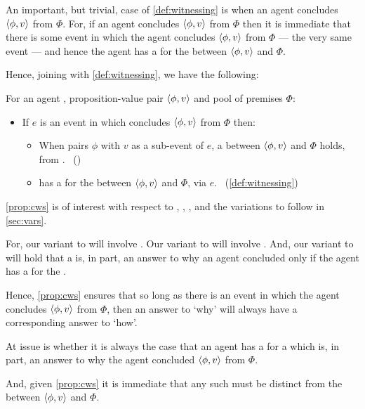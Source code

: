 \begin{note}
  An important, but trivial, case of \autoref{def:witnessing} is when an agent concludes \(\langle \phi, v \rangle\) from \(\Phi\).
  For, if an agent concludes \(\langle \phi, v \rangle\) from \(\Phi\) then it is immediate that there is some event in which the agent concludes \(\langle \phi, v \rangle\) from \(\Phi\) --- the very same event --- and hence the agent has a \wit{} for the \ros{} between \(\langle \phi, v \rangle\) and \(\Phi\).

  Hence, joining \supportI{} with \autoref{def:witnessing}, we have the following:

  \begin{proposition}
    \label{prop:cws}
    For an agent \vAgent{}, proposition-value pair \(\langle \phi, v \rangle\) and pool of premises \(\Phi\):
    \begin{itemize}
    \item
      If \(e\) is an event in which \vAgent{} concludes \(\langle \phi, v \rangle\) from \(\Phi\) then:
      \begin{itemize}
      \item
        When \vAgent{} pairs \(\phi\) with \(v\) as a sub-event of \(e\), a \ros{} between \(\langle \phi, v \rangle\) and \(\Phi\) holds, from .%
        \mbox{ }\hfill(\supportI{})
      \item
        \vAgent{} has a \wit{} for the \ros{} between \(\langle \phi, v \rangle\) and \(\Phi\), via \(e\).%
        \mbox{ }\hfill(\autoref{def:witnessing})
      \end{itemize}
    \end{itemize}
    \vspace{-\baselineskip}
  \end{proposition}

  \autoref{prop:cws} is of interest with respect to \qWhy{}, \qHow{}, \issueInclusion{}, and the variations to follow in \autoref{sec:vars}.

  For, our variant to \qWhy{} will involve .
  Our variant to \qHow{} will involve .
  And, our variant to \issueInclusion{} will hold that a \ros{} is, in part, an answer to why an agent concluded only if the agent has a \wit{} for the \ros{}.

  Hence, \autoref{prop:cws} ensures that so long as there is an event in which the agent concludes \(\langle \phi, v \rangle\) from \(\Phi\), then an answer to `why' will always have a corresponding answer to `how'.

  At issue is whether it is always the case that an agent has a \wit{} for a \ros{} which is, in part, an answer to why the agent concluded \(\langle \phi, v \rangle\) from \(\Phi\).

  And, given \autoref{prop:cws} it is immediate that any such \ros{} must be distinct from the \ros{} between \(\langle \phi, v \rangle\) and \(\Phi\).
\end{note}

